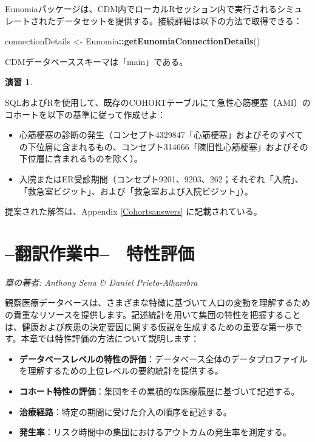 \documentclass[
  11pt]{book}
\newenvironment{Shaded}{\begin{snugshade}}{\end{snugshade}}
\newcommand{\FunctionTok}[1]{\textcolor[rgb]{0.13,0.29,0.53}{\textbf{#1}}}
\newcommand{\NormalTok}[1]{#1}
\newcommand{\OtherTok}[1]{\textcolor[rgb]{0.56,0.35,0.01}{#1}}
\newcommand{\SpecialCharTok}[1]{\textcolor[rgb]{0.81,0.36,0.00}{\textbf{#1}}}
\providecommand{\tightlist}{%
  \setlength{\itemsep}{0pt}\setlength{\parskip}{0pt}}
\theoremstyle{definition}
\theoremstyle{definition}
\theoremstyle{definition}
\newtheorem{exercise}{演習}[chapter]
\theoremstyle{definition}
\theoremstyle{remark}
\begin{document}
Eunomiaパッケージは、CDM内でローカルRセッション内で実行されるシミュレートされたデータセットを提供する。接続詳細は以下の方法で取得できる：

\begin{Shaded}
\begin{Highlighting}[]
\NormalTok{connectionDetails }\OtherTok{\textless{}{-}}\NormalTok{ Eunomia}\SpecialCharTok{::}\FunctionTok{getEunomiaConnectionDetails}\NormalTok{()}
\end{Highlighting}
\end{Shaded}

CDMデータベーススキーマは「main」である。

\begin{exercise}
\protect\hypertarget{exr:exerciseCohortsSql}{}\label{exr:exerciseCohortsSql}

SQLおよびRを使用して、既存のCOHORTテーブルにて急性心筋梗塞（AMI）のコホートを以下の基準に従って作成せよ：

\begin{itemize}
\tightlist
\item
  心筋梗塞の診断の発生（コンセプト4329847「心筋梗塞」およびそのすべての下位層に含まれるもの、コンセプト314666「陳旧性心筋梗塞」およびその下位層に含まれるものを除く）。
\item
  入院またはER受診期間（コンセプト9201、9203、262；それぞれ「入院」、 「救急室ビジット」、および「救急室および入院ビジット」）。
\end{itemize}

\end{exercise}

提案された解答は、Appendix \ref{Cohortsanswers} に記載されている。

\chapter{--翻訳作業中--　特性評価}\label{Characterization}

\emph{章の著者: Anthony Sena \& Daniel Prieto-Alhambra}

観察医療データベースは、さまざまな特徴に基づいて人口の変動を理解するための貴重なリソースを提供します。記述統計を用いて集団の特性を把握することは、健康および疾患の決定要因に関する仮説を生成するための重要な第一歩です。本章では特性評価の方法について説明します：

\begin{itemize}
\tightlist
\item
  \textbf{データベースレベルの特性の評価}：データベース全体のデータプロファイルを理解するための上位レベルの要約統計を提供する。
\item
  \textbf{コホート特性の評価}：集団をその累積的な医療履歴に基づいて記述する。
\item
  \textbf{治療経路}：特定の期間に受けた介入の順序を記述する。
\item
  \textbf{発生率}：リスク時間中の集団におけるアウトカムの発生率を測定する。
\end{itemize}
\end{document}
